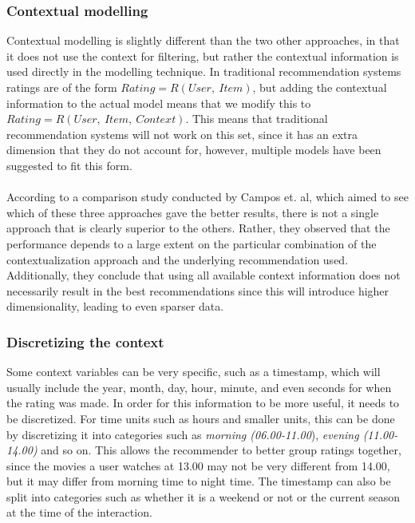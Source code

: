 \subsubsection*{Contextual modelling}
Contextual modelling is slightly different than the two other approaches, in that it does not use the context for filtering, but rather the contextual information is used directly in the modelling technique.
In traditional recommendation systems ratings are of the form $Rating = R(User, \: Item)$, but adding the contextual information to the actual model means that we modify this to $Rating = R(User, \: Item, \: Context)$.
This means that traditional recommendation systems will not work on this set, since it has an extra dimension that they do not account for, however, multiple models have been suggested to fit this form\cite{Adomavicius2011}.
\\\\
According to a comparison study conducted by Campos et. al\cite{10.1007/978-3-642-39878-0_13}, which aimed to see which of these three approaches gave the better results, there is not a single approach that is clearly superior to the others.
Rather, they observed that the performance depends to a large extent on the particular combination of the contextualization approach and the underlying recommendation used.\\
Additionally, they conclude that using all available context information does not necessarily result in the best recommendations since this will introduce higher dimensionality, leading to even sparser data.

\subsubsection*{Discretizing the context}
Some context variables can be very specific, such as a timestamp, which will usually include the year, month, day, hour, minute, and even seconds for when the rating was made.
In order for this information to be more useful, it needs to be discretized.
For time units such as hours and smaller units, this can be done by discretizing it into categories such as \textit{morning (06.00-11.00}), \textit{evening (11.00-14.00)} and so on.
This allows the recommender to better group ratings together, since the movies a user watches at 13.00 may not be very different from 14.00, but it may differ from morning time to night time.
The timestamp can also be split into categories such as whether it is a weekend or not or the current season at the time of the interaction.

